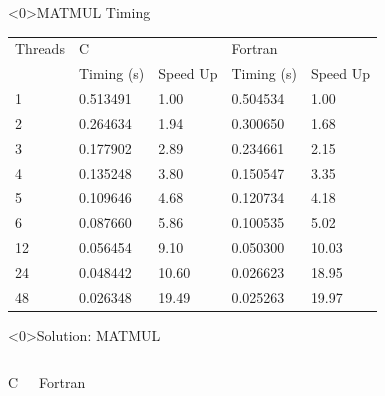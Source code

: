 \documentclass[10pt,t]{beamer}
\begin{document}
\begin{frame}<0>{MATMUL Timing}
  \begin{exampleblock}{}
    \begin{center}
      \begin{tabular}{|b|b|b|b|b|}
        \hline
        \rowcolor{lublue}Threads & \multicolumn{2}{b|}{C} & \multicolumn{2}{b|}{Fortran} \\
        \cline{2-5}
        \rowcolor{lublue}& Timing (s) & Speed Up & Timing (s) & Speed Up \\
        \hline
        1 & 0.513491  &  1.00  & 0.504534  &   1.00 \\
        2 & 0.264634  &  1.94  & 0.300650  &   1.68 \\
        3 & 0.177902  &  2.89  & 0.234661  &   2.15 \\
        4 & 0.135248  &  3.80  & 0.150547  &   3.35 \\
        5 & 0.109646  &  4.68  & 0.120734  &   4.18 \\
        6 & 0.087660  &  5.86  & 0.100535  &   5.02 \\
        12 & 0.056454 &  9.10  & 0.050300  &  10.03 \\
        24 & 0.048442 & 10.60  & 0.026623  &  18.95 \\
        48 & 0.026348 & 19.49  & 0.025263  &  19.97 \\
        \hline
      \end{tabular}
    \end{center}
    \end{exampleblock}
\end{frame}

\begin{frame}<0>{Solution: MATMUL}
  \vspace{-0.5cm}
  \begin{columns}
    \vspace{-0.5cm}
    \begin{exampleblock}{C}
      
    \end{exampleblock}
    \vspace{-0.5cm}
    \begin{exampleblock}{Fortran}
      
    \end{exampleblock}
  \end{columns}
\end{frame}
\end{document}
